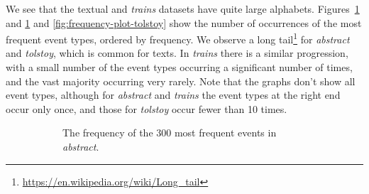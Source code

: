 We see that the textual and \emph{trains} datasets have quite large alphabets. Figures~\ref{fig:frequency-plot-nsf} and \ref{fig:frequency-plot-nsf} and \ref{fig:frequency-plot-tolstoy} show the number of occurrences of the most frequent event types, ordered by frequency. We observe a long tail\footnote{\url{https://en.wikipedia.org/wiki/Long_tail}} for \emph{abstract} and \emph{tolstoy}, which is common for texts. In \emph{trains} there is a similar progression, with a small number of the event types occurring a significant number of times, and the vast majority occurring very rarely. Note that the graphs don't show all event types, although for \emph{abstract} and \emph{trains} the event types at the right end occur only once, and those for \emph{tolstoy} occur fewer than 10 times.

\begin{figure}
\centering

\def\testwidth{6cm}
\def\testheight{5cm}

\begin{subfigure}[b]{\textwidth}
\centering


\caption{The frequency of the 300 most frequent events in \emph{abstract}.}
\label{fig:frequency-plot-nsf}
\end{subfigure}

\par\bigskip

\begin{subfigure}[b]{\textwidth}
\centering

\end{subfigure}
\end{figure}
